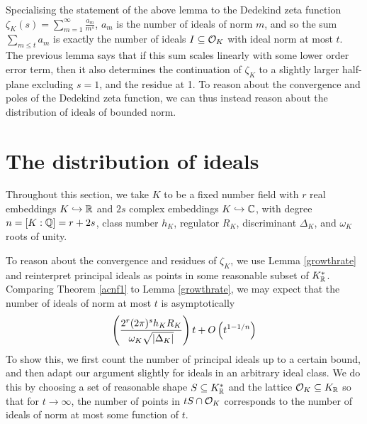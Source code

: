 \documentclass[11pt]{report}
\begin{document}
Specialising the statement of the above lemma to the Dedekind zeta function $\zeta_K(s) = \sum_{m = 1}^\infty \frac{a_m}{m^s}$, $a_m$ is the number of ideals of norm $m$, and so the sum $\sum_{m \leq t} a_m$ is exactly the number of ideals $I \subseteq \mathcal{O}_K$ with ideal norm at most $t$. The previous lemma says that if this sum scales linearly with some lower order error term, then it also determines the continuation of $\zeta_K$ to a slightly larger half-plane excluding $s = 1$, and the residue at 1. To reason about the convergence and poles of the Dedekind zeta function, we can thus instead reason about the distribution of ideals of bounded norm.
\section{The distribution of ideals}
Throughout this section, we take $K$ to be a fixed number field with $r$ real embeddings $K \hookrightarrow \mathbb{R}$ and $2s$ complex embeddings $K \hookrightarrow \mathbb{C}$, with degree $n = [K : \mathbb{Q}] = r + 2s$, class number $h_K$, regulator $R_K$, discriminant $\Delta_K$, and $\omega_K$ roots of unity.

To reason about the convergence and residues of $\zeta_K$, we use Lemma \ref{growthrate} and reinterpret principal ideals as points in some reasonable subset of $K_{\mathbb{R}}^*$. Comparing Theorem \ref{acnf1} to Lemma \ref{growthrate}, we may expect that the number of ideals of norm at most $t$ is asymptotically
$$
    \left(  \frac{2^r(2\pi)^sh_KR_K}{\omega_K\sqrt{\left| \Delta_K \right|}}  \right)t + O\left(  t^{1 - 1/n}  \right)
$$
To show this, we first count the number of principal ideals up to a certain bound, and then adapt our argument slightly for ideals in an arbitrary ideal class. We do this by choosing a set of reasonable shape $S \subseteq K_{\mathbb{R}}^*$ and the lattice $\mathcal{O}_K \subseteq K_{\mathbb{R}}$ so that for $t \to \infty$, the number of points in $tS \cap \mathcal{O}_K$ corresponds to the number of ideals of norm at most some function of $t$.
\end{document}
